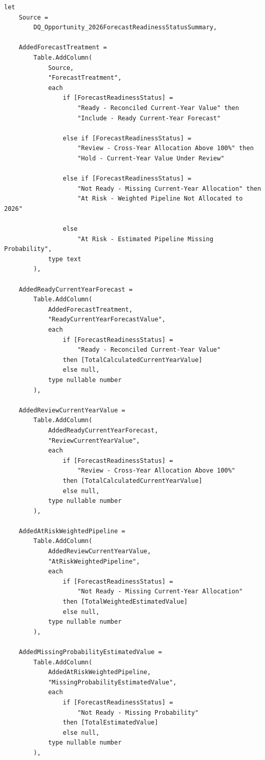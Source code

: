 \documentclass[11pt,a4paper]{article}
\begin{document}
\begin{lstlisting}[style=powerquery]
let
    Source =
        DQ_Opportunity_2026ForecastReadinessStatusSummary,

    AddedForecastTreatment =
        Table.AddColumn(
            Source,
            "ForecastTreatment",
            each
                if [ForecastReadinessStatus] =
                    "Ready - Reconciled Current-Year Value" then
                    "Include - Ready Current-Year Forecast"

                else if [ForecastReadinessStatus] =
                    "Review - Cross-Year Allocation Above 100%" then
                    "Hold - Current-Year Value Under Review"

                else if [ForecastReadinessStatus] =
                    "Not Ready - Missing Current-Year Allocation" then
                    "At Risk - Weighted Pipeline Not Allocated to 2026"

                else
                    "At Risk - Estimated Pipeline Missing Probability",
            type text
        ),

    AddedReadyCurrentYearForecast =
        Table.AddColumn(
            AddedForecastTreatment,
            "ReadyCurrentYearForecastValue",
            each
                if [ForecastReadinessStatus] =
                    "Ready - Reconciled Current-Year Value"
                then [TotalCalculatedCurrentYearValue]
                else null,
            type nullable number
        ),

    AddedReviewCurrentYearValue =
        Table.AddColumn(
            AddedReadyCurrentYearForecast,
            "ReviewCurrentYearValue",
            each
                if [ForecastReadinessStatus] =
                    "Review - Cross-Year Allocation Above 100%"
                then [TotalCalculatedCurrentYearValue]
                else null,
            type nullable number
        ),

    AddedAtRiskWeightedPipeline =
        Table.AddColumn(
            AddedReviewCurrentYearValue,
            "AtRiskWeightedPipeline",
            each
                if [ForecastReadinessStatus] =
                    "Not Ready - Missing Current-Year Allocation"
                then [TotalWeightedEstimatedValue]
                else null,
            type nullable number
        ),

    AddedMissingProbabilityEstimatedValue =
        Table.AddColumn(
            AddedAtRiskWeightedPipeline,
            "MissingProbabilityEstimatedValue",
            each
                if [ForecastReadinessStatus] =
                    "Not Ready - Missing Probability"
                then [TotalEstimatedValue]
                else null,
            type nullable number
        ),


\end{lstlisting}
\end{document}
